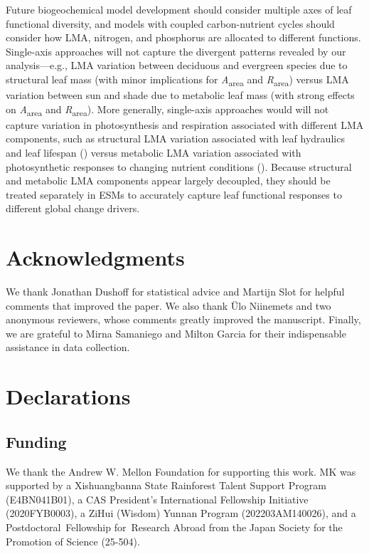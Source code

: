 \documentclass[
  12pt,
  letterpaper,
  DIV=11,
  numbers=noendperiod]{scrartcl}
\begin{document}
Future biogeochemical model development should consider multiple axes of
leaf functional diversity, and models with coupled carbon-nutrient
cycles should consider how LMA, nitrogen, and phosphorus are allocated
to different functions. Single-axis approaches will not capture the
divergent patterns revealed by our analysis---e.g., LMA variation
between deciduous and evergreen species due to structural leaf mass
(with minor implications for \emph{A}\textsubscript{area} and
\emph{R}\textsubscript{area}) versus LMA variation between sun and shade
due to metabolic leaf mass (with strong effects on
\emph{A}\textsubscript{area} and \emph{R}\textsubscript{area}). More
generally, single-axis approaches would will not capture variation in
photosynthesis and respiration associated with different LMA components,
such as structural LMA variation associated with leaf hydraulics and
leaf lifespan () versus
metabolic LMA variation associated with photosynthetic responses to
changing nutrient conditions (). Because structural and metabolic LMA components appear largely
decoupled, they should be treated separately in ESMs to accurately
capture leaf functional responses to different global change drivers.

\section{Acknowledgments}\label{acknowledgments}

We thank Jonathan Dushoff for statistical advice and Martijn Slot for
helpful comments that improved the paper. We also thank Ülo Niinemets
and two anonymous reviewers, whose comments greatly improved the
manuscript. Finally, we are grateful to Mirna Samaniego and Milton
Garcia for their indispensable assistance in data collection.

\section{Declarations}\label{declarations}

\subsection{Funding}\label{funding}

We thank the Andrew W. Mellon Foundation for supporting this work. MK
was supported by a Xishuangbanna State Rainforest Talent Support Program
(E4BN041B01), a CAS President's International Fellowship Initiative
(2020FYB0003), a ZiHui (Wisdom) Yunnan Program (202203AM140026), and a
Postdoctoral~Fellowship for~Research Abroad from the Japan Society for
the Promotion of Science (25-504).
\end{document}
